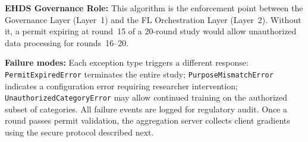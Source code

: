 \documentclass[conference]{IEEEtran}
\begin{document}
\textbf{EHDS Governance Role:} This algorithm is the enforcement point between the Governance Layer (Layer~1) and the FL Orchestration Layer (Layer~2). Without it, a permit expiring at round~15 of a 20-round study would allow unauthorized data processing for rounds~16--20.

\begin{figure}[htbp]
\centering
{}
\end{figure}

\textbf{Failure modes:} Each exception type triggers a different response: \texttt{PermitExpiredError} terminates the entire study; \texttt{PurposeMismatchError} indicates a configuration error requiring researcher intervention; \texttt{UnauthorizedCategoryError} may allow continued training on the authorized subset of categories. All failure events are logged for regulatory audit. Once a round passes permit validation, the aggregation server collects client gradients using the secure protocol described next.
\end{document}
